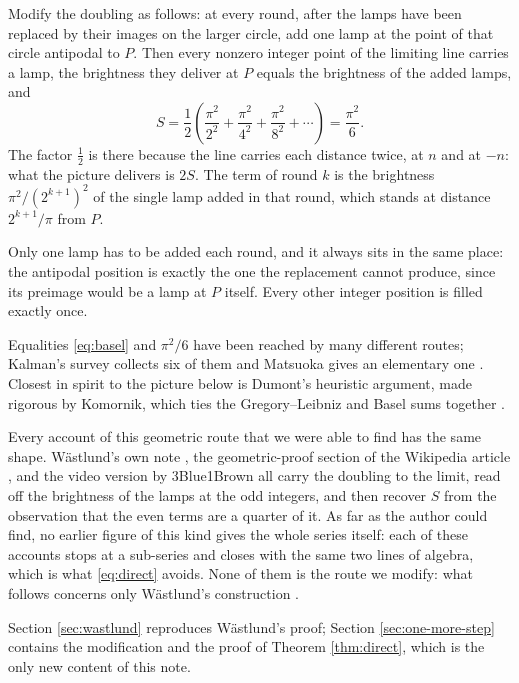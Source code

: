 \begin{theorem}\label{thm:direct}
Modify the doubling as follows: at every round, after the lamps have been replaced by their
images on the larger circle, add one lamp at the point of that circle antipodal to $P$. Then
every nonzero integer point of the limiting line carries a lamp, the brightness they deliver
at $P$ equals the brightness of the added lamps, and
\begin{equation}
  S=\frac{1}{2}\left(\frac{\pi^{2}}{2^{2}}+\frac{\pi^{2}}{4^{2}}+\frac{\pi^{2}}{8^{2}}+\cdots\right)
   =\frac{\pi^{2}}{6}.
  \label{eq:direct}
\end{equation}
The factor $\frac12$ is there because the line carries each distance twice, at $n$ and at $-n$:
what the picture delivers is $2S$. The term of round $k$ is the brightness $\pi^{2}/(2^{k+1})^{2}$
of the single lamp added in that round, which stands at distance $2^{k+1}/\pi$ from $P$.
\end{theorem}

Only one lamp has to be added each round, and it always sits in the same place: the antipodal
position is exactly the one the replacement cannot produce, since its preimage would be a lamp
at $P$ itself. Every other integer position is filled exactly once.

Equalities \eqref{eq:basel} and $\pi^{2}/6$ have been reached by many different routes;
Kalman's survey collects six of them \cite{kalman} and Matsuoka gives an elementary one
\cite{matsuoka}. Closest in spirit to the picture below is Dumont's heuristic argument,
made rigorous by Komornik, which ties the Gregory--Leibniz and Basel sums together
\cite{komornik}.

Every account of this geometric route that we were able to find has the same shape. W\"astlund's
own note \cite{wastlund}, the geometric-proof section of the Wikipedia article \cite{wikipedia},
and the video version by 3Blue1Brown \cite{threeblueonebrown} all carry the doubling to the
limit, read off the brightness of the lamps at the odd integers, and then recover $S$ from the
observation that the even terms are a quarter of it. As far as the author could find, no earlier
figure of this kind gives the whole series itself: each of these accounts stops at a sub-series
and closes with the same two lines of algebra, which is what \eqref{eq:direct} avoids. None of
them is the route we modify: what follows concerns only W\"astlund's construction
\cite{wastlund}.

Section \ref{sec:wastlund} reproduces W\"astlund's proof; Section \ref{sec:one-more-step}
contains the modification and the proof of Theorem \ref{thm:direct}, which is the only new
content of this note.
